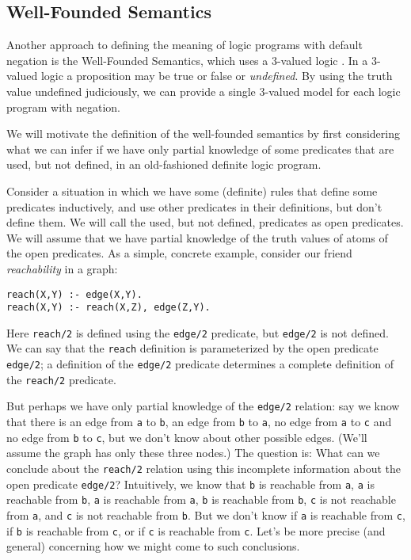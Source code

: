 \subsection{Well-Founded Semantics}
Another approach to defining the meaning of logic programs with
default negation is the Well-Founded Semantics, which uses a 3-valued
logic \cite{vangelder-et-al}.  In a 3-valued logic a proposition may
be true or false or {\em undefined}.  By using the truth value
undefined judiciously, we can provide a single 3-valued model for each
logic program with negation.

We will motivate the definition of the well-founded semantics by first
considering what we can infer if we have only partial knowledge of
some predicates that are used, but not defined, in an old-fashioned
definite logic program.

Consider a situation in which we have some (definite) rules that
define some predicates inductively, and use other predicates in their
definitions, but don't define them.  We will call the used, but not
defined, predicates as open predicates.  We will assume that we have
partial knowledge of the truth values of atoms of the open predicates.
As a simple, concrete example, consider our friend {\em reachability}
in a graph:
\begin{verbatim}
reach(X,Y) :- edge(X,Y).
reach(X,Y) :- reach(X,Z), edge(Z,Y).
\end{verbatim}
Here \verb|reach/2| is defined using the \verb|edge/2| predicate, but
\verb|edge/2| is not defined.  We can say that the \verb|reach|
definition is parameterized by the open predicate \verb|edge/2|; a
definition of the \verb|edge/2| predicate determines a complete
definition of the \verb|reach/2| predicate.

But perhaps we have only partial knowledge of the \verb|edge/2|
relation: say we know that there is an edge from \verb|a| to \verb|b|,
an edge from \verb|b| to \verb|a|, no edge from \verb|a| to \verb|c|
and no edge from \verb|b| to \verb|c|, but we don't know about other
possible edges.  (We'll assume the graph has only these three nodes.)
The question is: What can we conclude about the \verb|reach/2|
relation using this incomplete information about the open predicate
\verb|edge/2|?  Intuitively, we know that \verb|b| is reachable from
\verb|a|, \verb|a| is reachable from \verb|b|, \verb|a| is reachable
from \verb|a|, \verb|b| is reachable from \verb|b|, \verb|c| is not
reachable from \verb|a|, and \verb|c| is not reachable from \verb|b|.
But we don't know if \verb|a| is reachable from \verb|c|, if \verb|b|
is reachable from \verb|c|, or if \verb|c| is reachable from \verb|c|.
Let's be more precise (and general) concerning how we might come to
such conclusions.

